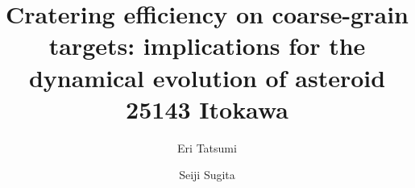 \documentclass[3p,authoryear]{elsarticle}
\begin{document}
\begin{frontmatter}

\title{Cratering efficiency on coarse-grain targets: implications for the dynamical evolution of asteroid 25143 Itokawa}

\author[affiliation1]{Eri Tatsumi }
\author[affiliation1,affiliation2]{Seiji Sugita}
\address[affiliation1]{Department of Earth and Planetary Science, the University of Tokyo, 7-3-1 Hongo, Bunkyo-ku, Tokyo 113-0033 Japan}
\address[affiliation2]{Research Center for the Early Universe, the University of Tokyo, 7-3-1 Hongo, Bunkyo-ku, Tokyo 113-0033 Japan}

\author{}



\end{frontmatter}
\end{document}
